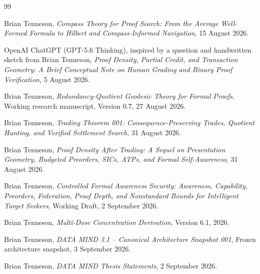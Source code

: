 \documentclass[11pt]{article}
\theoremstyle{definition}
\theoremstyle{remark}
\begin{document}
\begin{thebibliography}{99}

Brian Tenneson,
\emph{Compass Theory for Proof Search: From the Average Well-Formed Formula to Hilbert and Compass-Informed Navigation},
15 August 2026.

OpenAI ChatGPT (GPT-5.6 Thinking), inspired by a question and handwritten sketch from Brian Tenneson,
\emph{Proof Density, Partial Credit, and Transaction Geometry: A Brief Conceptual Note on Human Grading and Binary Proof Verification},
5 August 2026.

Brian Tenneson,
\emph{Redundancy-Quotient Geodesic Theory for Formal Proofs},
Working research manuscript, Version 0.7, 27 August 2026.

Brian Tenneson,
\emph{Trading Theorem 001: Consequence-Preserving Trades, Quotient Hunting, and Verified Settlement Search},
31 August 2026.

Brian Tenneson,
\emph{Proof Density After Trading: A Sequel on Presentation Geometry, Budgeted Preorders, SICs, ATPs, and Formal Self-Awareness},
31 August 2026.

Brian Tenneson,
\emph{Controlled Formal Awareness Security: Awareness, Capability, Preorders, Federation, Proof Depth, and Nonstandard Bounds for Intelligent Target Seekers},
Working Draft, 2 September 2026.

Brian Tenneson,
\emph{Multi-Dose Concentration Derivation},
Version 6.1, 2026.

Brian Tenneson,
\emph{DATA MIND 3.1 -- Canonical Architecture Snapshot 001},
Frozen architecture snapshot, 3 September 2026.

Brian Tenneson,
\emph{DATA MIND Thesis Statements},
2 September 2026.

\end{thebibliography}
\end{document}
